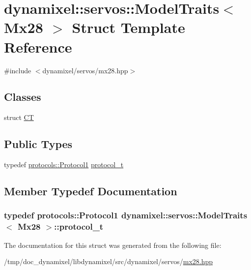 \hypertarget{structdynamixel_1_1servos_1_1_model_traits_3_01_mx28_01_4}{}\section{dynamixel\+:\+:servos\+:\+:Model\+Traits$<$ Mx28 $>$ Struct Template Reference}
\label{structdynamixel_1_1servos_1_1_model_traits_3_01_mx28_01_4}


{\ttfamily \#include $<$dynamixel/servos/mx28.\+hpp$>$}

\subsection*{Classes}
\begin{DoxyCompactItemize}
\item 
struct \hyperlink{structdynamixel_1_1servos_1_1_model_traits_3_01_mx28_01_4_1_1_c_t}{CT}
\end{DoxyCompactItemize}
\subsection*{Public Types}
\begin{DoxyCompactItemize}
\item 
typedef \hyperlink{classdynamixel_1_1protocols_1_1_protocol1}{protocols\+::\+Protocol1} \hyperlink{structdynamixel_1_1servos_1_1_model_traits_3_01_mx28_01_4_a15e6e7bed6719eb419a94df31b019677}{protocol\+\_\+t}
\end{DoxyCompactItemize}


\subsection{Member Typedef Documentation}
\subsubsection[{\texorpdfstring{protocol\+\_\+t}{protocol_t}}]{\setlength{\rightskip}{0pt plus 5cm}typedef {\bf protocols\+::\+Protocol1} {\bf dynamixel\+::servos\+::\+Model\+Traits}$<$ {\bf Mx28} $>$\+::{\bf protocol\+\_\+t}}\hypertarget{structdynamixel_1_1servos_1_1_model_traits_3_01_mx28_01_4_a15e6e7bed6719eb419a94df31b019677}{}\label{structdynamixel_1_1servos_1_1_model_traits_3_01_mx28_01_4_a15e6e7bed6719eb419a94df31b019677}


The documentation for this struct was generated from the following file\+:\begin{DoxyCompactItemize}
\item 
/tmp/doc\+\_\+dynamixel/libdynamixel/src/dynamixel/servos/\hyperlink{mx28_8hpp}{mx28.\+hpp}\end{DoxyCompactItemize}
